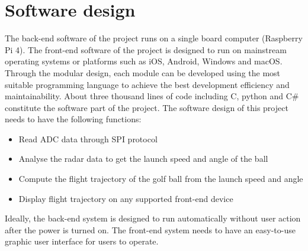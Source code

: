 \newpage
\section{Software design}
The back-end software of the project runs on a single board computer (Raspberry Pi 4). The front-end software of the project is designed to run on mainstream operating systems or platforms such as iOS, Android, Windows and macOS. Through the modular design, each module can be developed using the most suitable programming language to achieve the best development efficiency and maintainability. About three thousand lines of code including C, python and C\# constitute the software part of the project. The software design of this project needs to have the following functions: 
\begin{itemize}[noitemsep,topsep=0pt]
   \item Read ADC data through SPI protocol
   \item Analyse the radar data to get the launch speed and angle of the ball
   \item Compute the flight trajectory of the golf ball from the launch speed and angle
   \item Display flight trajectory on any supported front-end device
\end{itemize}
   
Ideally, the back-end system is designed to run automatically without user action after the power is turned on. The front-end system needs to have an easy-to-use graphic user interface for users to operate.


